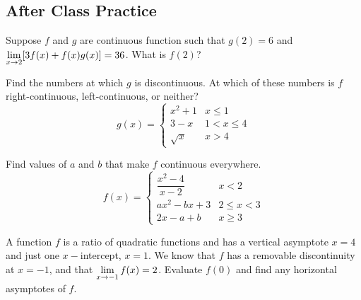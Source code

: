 \documentclass[notes]{subfiles}
\begin{document}
	\subsection*{After Class Practice}
		\begin{ex}
			Suppose \(f\) and \(g\) are continuous function such that \(g(2) = 6\) and \(\displaystyle \lim_{x\to 2} [3f(x) + f(x)g(x)] = 36\).  What is \(f(2)\)?
		\end{ex}
			
		\begin{ex}
			Find the numbers at which \(g\) is discontinuous.  At which of these numbers is \(f\) right-continuous, left-continuous, or neither?
				\[ g(x) = \begin{cases}x^2 + 1 & x \leq 1\\ 3-x & 1 < x \leq 4 \\ \sqrt{x} & x > 4 \end{cases}\]
		\end{ex}
			\newpage
			
		\begin{ex}
			Find values of \(a\) and \(b\) that make \(f\) continuous everywhere.
				\[f(x) = \begin{cases}\dfrac{x^2-4}{x-2} & x < 2 \\ ax^2 - bx + 3 & 2\leq x < 3 \\ 2x - a + b & x \geq 3 \end{cases}\]
		\end{ex}
		
		\begin{ex}
			A function \(f\) is a ratio of quadratic functions and has a vertical asymptote \(x=4\) and just one \(x-\)intercept, \(x=1\).  We know that \(f\) has a removable discontinuity at \(x=-1\), and that \(\displaystyle \lim_{x\to -1} f(x) = 2\).  Evaluate \(f(0)\) and find any horizontal asymptotes of \(f\).
		\end{ex}

\clearpage
\end{document}
